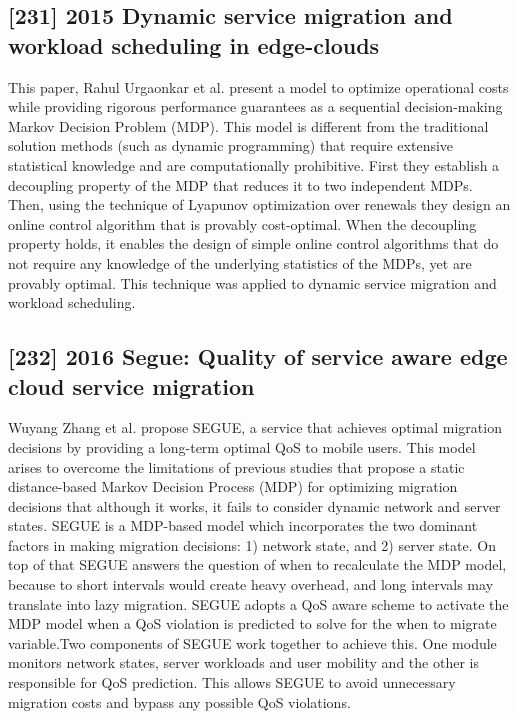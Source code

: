 \subsection{[231] 2015 Dynamic service migration and workload scheduling in edge-clouds}
\label{subsec:paper09}
This paper, Rahul Urgaonkar et al. \cite{urgaonkar2015dynamic} present a model to optimize operational costs while providing rigorous performance guarantees as a sequential decision-making Markov Decision Problem (MDP). This model is different from the traditional solution methods (such as dynamic programming) that require extensive statistical knowledge and are computationally prohibitive. First they establish a decoupling property of the MDP that reduces it to two independent MDPs. Then, using the technique of Lyapunov optimization over renewals they design an online control algorithm that is provably cost-optimal. When the decoupling property holds, it enables the design of simple online control algorithms that do not require any knowledge of the underlying statistics of the MDPs, yet are provably optimal. This technique was applied to dynamic service migration and workload scheduling.

\subsection{[232] 2016 Segue: Quality of service aware edge cloud service migration}
\label{subsec:paper10}
Wuyang Zhang et al. \cite{zhang2016segue} propose SEGUE, a service that achieves optimal migration decisions by providing a long-term optimal QoS to mobile users. This model arises to overcome the limitations of previous studies that propose a static distance-based Markov Decision Process (MDP) for optimizing migration decisions that although it works, it fails to consider dynamic network and server states. SEGUE is a MDP-based model which incorporates the two dominant factors in making migration decisions: 1) network state, and 2) server state. On top of that SEGUE answers the question of when to recalculate the MDP model, because to short intervals would create heavy overhead, and long intervals may translate into lazy migration. SEGUE adopts a QoS aware scheme to activate the MDP model when a QoS violation is predicted to solve for the when to migrate variable.Two components of SEGUE work together to achieve this. One module monitors network states, server workloads and user mobility and the other is responsible for QoS prediction. This allows SEGUE to avoid unnecessary migration costs and bypass any possible QoS violations.


